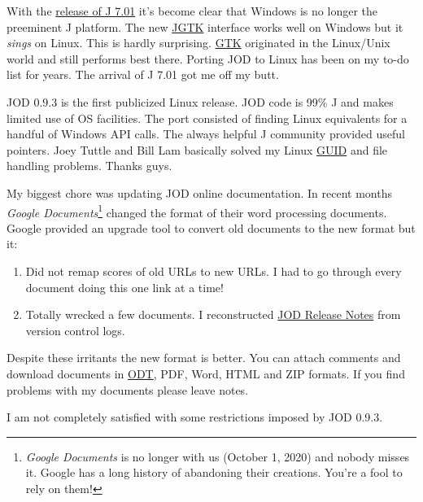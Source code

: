 With the
\href{http://bakerjd99.wordpress.com/2011/02/12/j-7-01-now-playing-in-your-browser/}{release
of J 7.01} it's become clear that Windows is no longer the preeminent J
platform. The new
\href{http://www.jsoftware.com/jwiki/System/Installation/J701/Gtk\#Install}{JGTK}
interface works well on Windows but it \emph{sings} on Linux. This is
hardly surprising. \href{http://www.gtk.org/}{GTK} originated in the
Linux/Unix world and still performs best there. Porting JOD to Linux has
been on my to-do list for years. The arrival of J 7.01 got me off my
butt.

JOD 0.9.3 is the first publicized Linux release. JOD code is 99\% J and
makes limited use of OS facilities. The port consisted of finding Linux
equivalents for a handful of Windows API calls. The always helpful J
community provided useful pointers. Joey Tuttle and Bill Lam basically
solved my Linux
\href{http://en.wikipedia.org/wiki/Globally\_unique\_identifier}{GUID}
and file handling problems. Thanks guys.

My biggest chore was updating
JOD online documentation. In recent months
\emph{Google Documents}\footnote{\emph{Google Documents} is no longer
with us (October 1, 2020) and nobody misses it. Google has
a long history of abandoning their creations. You're
a fool to rely on them!
}
 changed the format of
their word processing documents. Google provided an upgrade tool to
convert old documents to the new format but it:

\begin{enumerate}
\tightlist
\item
  Did not remap scores of old URLs to new URLs. I had to go through
  every document doing this one link at a time!
\item
  Totally wrecked a few documents. I reconstructed
  \href{https://github.com/bakerjd99/jod/blob/master/jod/history.md}{JOD
  Release Notes} from version control logs.
\end{enumerate}
Despite these irritants the new format is better. You can attach
comments and download documents in
\href{http://www.coolutils.com/Formats/ODT}{ODT}, PDF, Word, HTML and
ZIP formats. If you find problems with my documents please leave notes.

I am not completely satisfied with some restrictions imposed by JOD
0.9.3.

